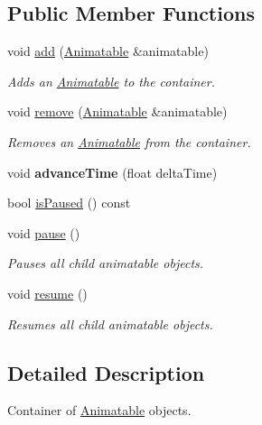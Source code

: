 \subsection*{Public Member Functions}
\begin{DoxyCompactItemize}
\item 
void \hyperlink{classzt_1_1_animatable_container_a4288e8efa0335f0f34b678a9f5b92219}{add} (\hyperlink{classzt_1_1_animatable}{Animatable} \&animatable)
\begin{DoxyCompactList}\small\item\em Adds an \hyperlink{classzt_1_1_animatable}{Animatable} to the container. \end{DoxyCompactList}\item 
void \hyperlink{classzt_1_1_animatable_container_ac6086455938dd4285bd6f7beca7d2eeb}{remove} (\hyperlink{classzt_1_1_animatable}{Animatable} \&animatable)
\begin{DoxyCompactList}\small\item\em Removes an \hyperlink{classzt_1_1_animatable}{Animatable} from the container. \end{DoxyCompactList}\item 
\mbox{\label{classzt_1_1_animatable_container_a51c0d2047544bb0bc49162a5c8a303ce}} 
void {\bfseries advance\+Time} (float delta\+Time)
\item 
bool \hyperlink{classzt_1_1_animatable_container_ad9101ffe27f3615e72bc66b04061b737}{is\+Paused} () const
\item 
void \hyperlink{classzt_1_1_animatable_container_a7c05633b4d68f39617f8ccc9bd752beb}{pause} ()
\begin{DoxyCompactList}\small\item\em Pauses all child animatable objects. \end{DoxyCompactList}\item 
\mbox{\label{classzt_1_1_animatable_container_a82fbd2812fbcfeaae56397730ae6468b}} 
void \hyperlink{classzt_1_1_animatable_container_a82fbd2812fbcfeaae56397730ae6468b}{resume} ()
\begin{DoxyCompactList}\small\item\em Resumes all child animatable objects. \end{DoxyCompactList}\end{DoxyCompactItemize}


\subsection{Detailed Description}
Container of \hyperlink{classzt_1_1_animatable}{Animatable} objects. 

